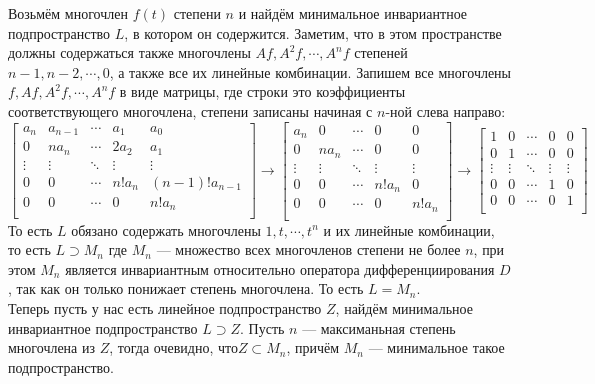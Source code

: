 \documentclass[12pt]{article} %
\begin{document}
\begin{enumerate}
    Возьмём многочлен $f(t)$ степени $n$ и найдём минимальное инвариантное подпространство $L$, в котором он содержится. Заметим, что в этом пространстве должны содержаться также многочлены $Af, A^2f, \cdots, A^nf$ степеней $n - 1, n - 2, \cdots, 0$, а также все их линейные комбинации. Запишем все многочлены $f, Af, A^2f, \cdots, A^nf$ в виде матрицы, где строки это коэффициенты соответствующего многочлена, степени записаны начиная с $n$-ной слева направо:\\
    \[
    \begin{bmatrix}
        a_n & a_{n - 1} & \cdots & a_1 & a_0\\
        0 & na_n & \cdots & 2a_2 & a_1\\
        \vdots & \vdots & \ddots & \vdots & \vdots\\
        0 & 0 &\cdots & n!a_n & (n - 1)!a_{n -1}\\
        0 & 0 &\cdots & 0 & n!a_n\\
    \end{bmatrix} \rightarrow
    \begin{bmatrix}
        a_n & 0 & \cdots & 0 & 0\\
        0 & na_n & \cdots & 0 & 0\\
        \vdots & \vdots & \ddots & \vdots & \vdots\\
        0 & 0 &\cdots & n!a_n & 0\\
        0 & 0 &\cdots & 0 & n!a_n\\
    \end{bmatrix} \rightarrow
    \begin{bmatrix}
        1 & 0 & \cdots & 0 & 0\\
        0 & 1 & \cdots & 0 & 0\\
        \vdots & \vdots & \ddots & \vdots & \vdots\\
        0 & 0 &\cdots & 1 & 0\\
        0 & 0 &\cdots & 0 & 1\\
    \end{bmatrix}
    \]
    То есть $L$ обязано содержать многочлены $1, t, \cdots, t^n$ и их линейные комбинации, то есть $L \supset M_n$ где $M_n$ --- множество всех многочленов степени не более $n$, при этом $M_n$ является инвариантным относительно оператора дифференциирования $D$, так как он только понижает степень многочлена. То есть $L = M_n$. \\

    Теперь пусть у нас есть линейное подпространство $Z$, найдём минимальное инвариантное подпространство $L \supset Z$. Пусть $n$ --- максиманьная степень многочлена из $Z$, тогда очевидно, что$Z \subset M_n$, причём $M_n$ --- минимальное такое подпространство.\\


\end{enumerate}
\end{document}
